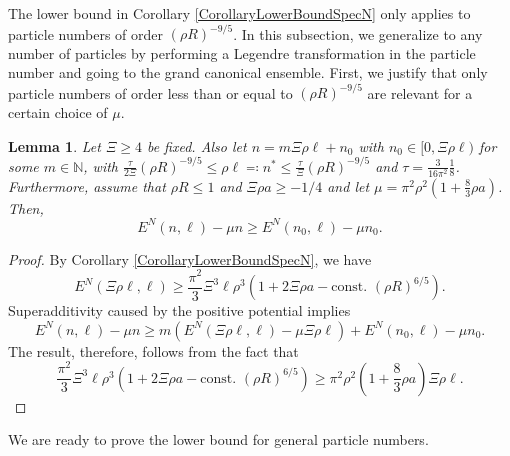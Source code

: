 \documentclass[a4paper,11pt]{article}
\newtheorem{lemma}[theorem]{Lemma}
\numberwithin{equation}{section}
\begin{document}
	The lower bound in Corollary \ref{CorollaryLowerBoundSpecN} only applies to particle numbers of order $ (\rho R)^{-9/5} $. In this subsection, we generalize to any number of particles by performing a Legendre transformation in the particle number and going to the grand canonical ensemble. First, we justify that only particle numbers of order less than or equal to $ (\rho R)^{-9/5} $ are relevant for a certain choice of $ \mu $.
		\begin{lemma}\label{LemmaLocalizationFbound}
			Let $ \Xi\geq 4 $ be fixed. Also let $ n=m\Xi \rho \ell+n_0 $ with $ n_0\in[0,\Xi\rho \ell) $ for some $ m\in\mathbb{N} $, with $\frac{\tau}{2\Xi} (\rho R)^{-9/5} \leq \rho\ell\eqqcolon n^{\ast}\leq \frac{\tau}{\Xi} (\rho R)^{-9/5} $ and $ \tau=\frac{3}{16\pi^2}\frac{1}{8} $. Furthermore, assume that $ \rho R\leq  1 $ and $\Xi \rho a \geq-1/4$ and let $ \mu=\pi^2\rho^2\left(1+\frac{8}{3}\rho a\right) $. Then,  \begin{equation}
			E^{N}(n,\ell)-\mu n \geq E^{N}(n_0,\ell)-\mu n_0.
			\end{equation}
		\end{lemma}
		\begin{proof}
			By Corollary \ref{CorollaryLowerBoundSpecN}, we have \begin{equation}
			E^{N}(\Xi\rho\ell,\ell)\geq\frac{\pi^2}{3}\Xi^3\ell\rho^3\left(1+2\Xi\rho a-\text{const. }(\rho R)^{6/5}\right).
			\end{equation}
			Superadditivity caused by the positive potential implies \begin{equation}
			E^N(n,\ell)-\mu n\geq m\left(E^N(\Xi\rho\ell,\ell)-\mu\Xi\rho\ell \right)+E^N(n_0,\ell)-\mu n_0.
			\end{equation}
			The result, therefore, follows from the fact that \begin{equation}
			\frac{\pi^2}{3}\Xi^3\ell\rho^3\left(1+2\Xi\rho a-\text{const. }(\rho R)^{6/5}\right)\geq \pi^2\rho^2\left(1+\frac{8}{3}\rho a\right) \Xi\rho\ell.
			\end{equation}
		\end{proof}
		We are ready to prove the lower bound for general particle numbers.
\end{document}
